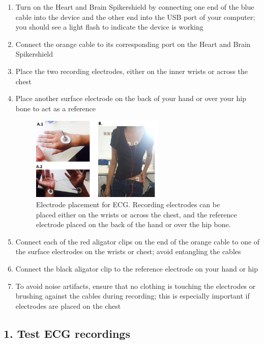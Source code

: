 \documentclass[12pt]{article}
\begin{document}
\begin{enumerate}
    \item Turn on the Heart and Brain Spikershield by connecting one end of the blue cable into the device and the other end into the USB port of your computer; you should see a light flash to indicate the device is working
    \item Connect the orange cable to its corresponding port on the Heart and Brain Spikershield
    \item Place the two recording electrodes, either on the inner wrists or across the chest
    \item Place another surface electrode on the back of your hand or over your hip bone to act as a reference
        
        \begin{figure}[h!]
        \centering
        \includegraphics[width=0.6\textwidth]{figures/ecgConfig.png}
        \caption{Electrode placement for ECG. Recording electrodes can
          be placed either on the wrists or across the chest, and the
          reference electrode placed on the back of the hand or over
          the hip bone.}
        \label{fig:config}
        \end{figure}%
    \item Connect each of the red aligator clips on the end of the orange cable to one of the surface electrodes on the wrists or chest; avoid entangling the cables
    \item Connect the black aligator clip to the reference electrode on your hand or hip
    \item To avoid noise artifacts, ensure that no clothing is touching the electrodes or brushing against the cables during recording; this is especially important if electrodes are placed on the chest
\end{enumerate}
 
\subsection*{1. Test ECG recordings}
\end{document}
